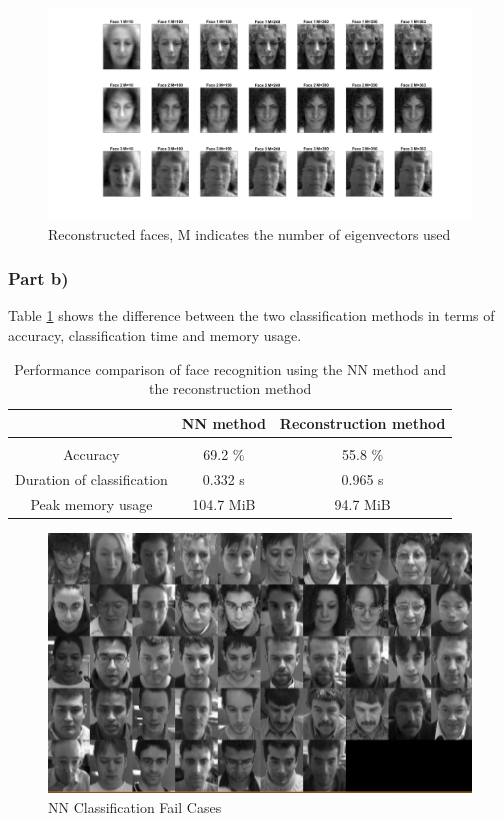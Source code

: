 \documentclass[10pt,technote]{IEEEtran}
\begin{document}
\begin{figure}[htb!]
    \centering
    \includegraphics[width=\linewidth]{../results/ex1aa/face_plots.png}
    \caption{Reconstructed faces, M indicates the number of eigenvectors used}
    \label{fig:reconstr_faces}
\end{figure}


\subsubsection{Part b)}
Table \ref{tab:NNvsRec} shows the difference between the two classification methods in terms of accuracy, classification time and memory usage.

\begin{table}[]
    \centering
    \begin{tabular}{c||c c}
         & NN method & Reconstruction method  \\\hline \hline\\
         Accuracy &  69.2 \% & 55.8 \% \\
         Duration of classification & 0.332 s & 0.965 s \\
         Peak memory usage & 104.7 MiB & 94.7 MiB
         
    \end{tabular}
    \caption{Performance comparison of face recognition using the NN method and the reconstruction method}
    \label{tab:NNvsRec}
\end{table}

\begin{figure}
    \centering
    \includegraphics[width=\linewidth]{../results/1bb/NN_FAIL2.png}
    \caption{NN Classification Fail Cases}
    \label{fig:nn_fails}
\end{figure}
\end{document}
